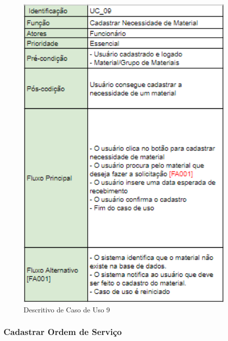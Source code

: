 \documentclass[rascunho,xindy,acronym,symbols]{fei}
\begin{document}
\begin{figure}[H]
    \centering
    \includegraphics[scale=0.6, width=300pt]{./Images/Descritivos/UC9.png}
    \caption{Descritivo de Caso de Uso 9}
     \label{fig:desc_uc8}
\end{figure}

\subsubsection{Cadastrar Ordem de Serviço}
\end{document}
